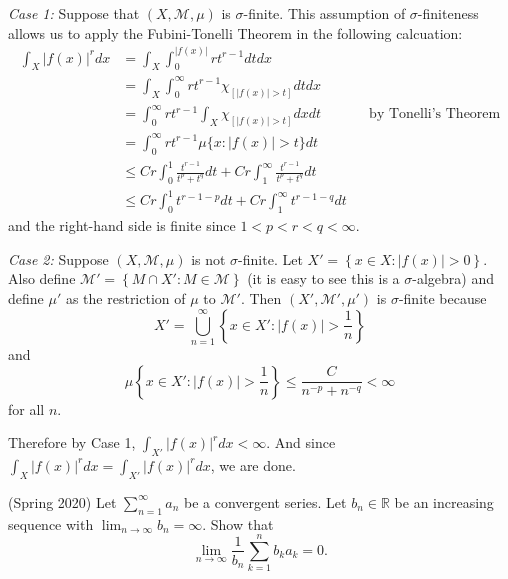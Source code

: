\documentclass[answers]{exam}
\theoremstyle{problemstyle}
\newcommand{\vt}{\vskip 5mm} %
\newcommand{\1}[1]{\textbf{1}_{\left[#1\right]}} %
\def\R{\mathbb{R}} %
\begin{document}
\begin{questions}
\begin{solution}
  \textit{Case 1:} Suppose that $(X,\mathcal{M},\mu)$ is $\sigma$-finite. This assumption of $\sigma$-finiteness allows us to apply the Fubini-Tonelli Theorem in the following calcuation:
  \begin{align*}
    \int_{X}|f(x)|^{r}dx
    &= \int_{X} \int_{0}^{|f(x)|}r t^{r-1}dt dx\\
    &=\int_{X} \int_{0}^{\infty}  rt^{r-1}\chi_{[ |f(x)|>t]}dtdx \\
    &=\int_{0}^{\infty}r t^{r-1}\int_{X} \chi_{[ |f(x)|>t]}dxdt &&\text{by Tonelli's Theorem}\\
    &=\int_{0}^{\infty}r t^{r-1}\mu\{x: |f(x)|>t\}dt\\ 
    &\leq Cr\int_{0}^{1}\frac{t^{r-1}}{t^{p}+t^{q}}dt + Cr\int_{1}^{\infty} \frac{t^{r-1}}{t^{p}+t^{q}}dt\\ 
    &\leq Cr\int_{0}^{1}t^{r-1-p}dt + Cr\int_{1}^{\infty} t^{r-1-q}dt
  \end{align*}
  and the right-hand side is finite since $1<p<r<q<\infty$.
  
  \vt
  \textit{Case 2:} Suppose $(X,\mathcal{M},\mu)$ is not $\sigma$-finite. Let $X'= \left\{ x\in X: |f(x)|>0 \right\}$. Also define $\mathcal{M}'=\left\{ M\cap X' : M\in \mathcal{M} \right\}$ (it is easy to see this is a $\sigma$-algebra) and define $\mu'$ as the restriction of $\mu$ to $\mathcal{M}'$. Then $(X',\mathcal{M}',\mu')$ is $\sigma$-finite because
  \begin{equation*}
    X'= \bigcup_{n=1}^{\infty}\left\{ x\in X': |f(x)|>\frac{1}{n} \right\}
  \end{equation*}
  and 
  \begin{equation*}
    \mu\left\{ x\in X': |f(x)|>\frac{1}{n} \right\} \leq \frac{C}{n^{-p}+n^{-q}}<\infty
  \end{equation*}
  for all $n$.

  Therefore by Case 1, $\int_{X'}|f(x)|^{r}dx<\infty$. And since $\int_{X}|f(x)|^{r}dx = \int_{X'}|f(x)|^{r}dx$, we are done. 
  \end{solution}

\question (Spring 2020)
Let $\sum_{n=1}^{\infty}a_{n}$ be a convergent series. Let $b_{n}\in\R$ be an increasing sequence with $\lim_{n\to\infty}b_{n}=\infty$. Show that
\begin{equation*}
  \lim_{n\to\infty} \frac{1}{b_{n}}\sum_{k=1}^{n}b_{k}a_{k} = 0.
\end{equation*}


\end{questions}
\end{document}
